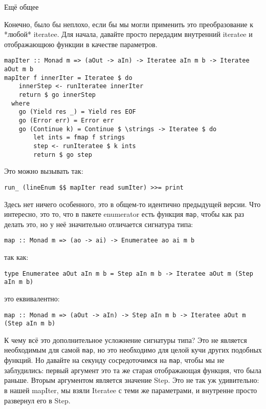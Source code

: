 Ещё общее

Конечно, было бы неплохо, если бы мы могли применить это преобразование к *любой* iteratee. Для начала, давайте просто передадим внутренний iteratee и отображающюю функции в качестве параметров.

\begin{lstlisting}
mapIter :: Monad m => (aOut -> aIn) -> Iteratee aIn m b -> Iteratee aOut m b
mapIter f innerIter = Iteratee $ do
    innerStep <- runIteratee innerIter
    return $ go innerStep
  where
    go (Yield res _) = Yield res EOF
    go (Error err) = Error err
    go (Continue k) = Continue $ \strings -> Iteratee $ do
        let ints = fmap f strings
        step <- runIteratee $ k ints
        return $ go step
\end{lstlisting}

Это можно вызывать так:

\begin{lstlisting}
run_ (lineEnum $$ mapIter read sumIter) >>= print
\end{lstlisting}

Здесь нет ничего особенного, это в общем-то идентично предыдущей версии. Что интересно, это то, что в пакете enumerator есть  функция \lstinline'map', чтобы как раз делать это, но у неё значительно отличается сигнатура типа:

\begin{lstlisting}
map :: Monad m => (ao -> ai) -> Enumeratee ao ai m b
\end{lstlisting}

так как:

\begin{lstlisting}
type Enumeratee aOut aIn m b = Step aIn m b -> Iteratee aOut m (Step aIn m b)
\end{lstlisting}

это еквивалентно:

\begin{lstlisting}
map :: Monad m => (aOut -> aIn) -> Step aIn m b -> Iteratee aOut m (Step aIn m b)
\end{lstlisting}

К чему всё это дополнительное усложнение сигнатуры типа? Это не является необходимым для самой \lstinline'map', но это необходимо для целой кучи других подобных функций. Но давайте на секунду сосредоточимся на \lstinline'map', чтобы мы не заблудились: первый аргумент это та же старая отображающая функция, что была раньше. Вторым аргументом является значение Step. Это не так уж удивительно: в нашей mapIter, мы взяли Iteratee с теми же параметрами, и внутренне просто развернул его в Step.

